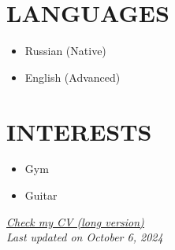 \documentclass[11pt,a4paper]{moderncv}
\begin{document}
\begin{minipage}[t]{0.35\textwidth}
\section{LANGUAGES}
\begin{itemize}
    \item Russian (Native)
    \item English (Advanced)
\end{itemize}

\section{INTERESTS}
\begin{itemize}
    \item Gym
    \item Guitar
\end{itemize}
\end{minipage}

\vspace*{\fill}
\begin{center}
\textit{\href{https://latexonline.cc/compile?git=https://github.com/kisnikser/CV&target=cv.tex&command=xelatex&force=true}{Check my CV (long version)}}\\
\textit{Last updated on October 6, 2024}
\end{center}
\vspace{-0.5cm}
\end{document}
